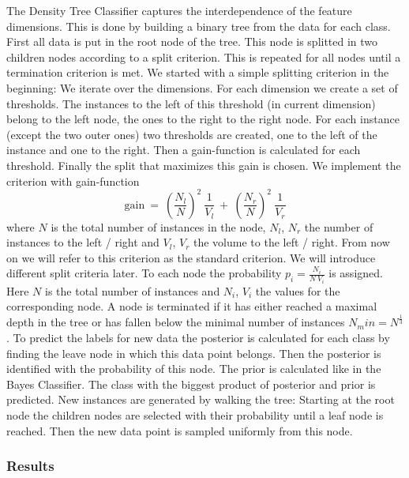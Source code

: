 \documentclass[draft]{article}
\begin{document}
The Density Tree Classifier captures the interdependence of the feature dimensions. This is done by 
building a binary tree from the data for each class.
First all data is put in the root node of the tree. This node is splitted in two children nodes according to a split criterion.
This is repeated for all nodes until a termination criterion is met.
\newline
We started with a simple splitting criterion in the beginning:
We iterate over the dimensions. For each dimension we create a set of thresholds. 
The instances to the left of this threshold (in current dimension) belong to the left node, the ones to 
the right to the right node. For each instance (except the two outer ones) two thresholds are created, one to the left
of the instance and one to the right.
Then a gain-function is calculated for each threshold. Finally the split that maximizes this gain is chosen.
We implement the criterion with gain-function
\begin{equation}
	\mathrm{gain} ~ = ~ ( \frac{N_l}{N} )^2 ~ \frac{1}{V_l} ~ +  ~ ( \frac{N_r}{N} )^2 ~ \frac{1}{V_r} 
\end{equation}
where $N$ is the total number of instances in the node, $N_l$, $N_r$ the number of instances to the left / right
and $V_l$, $V_r$ the volume to the left / right.
From now on we will refer to this criterion as the standard criterion. We will introduce different split 
criteria later.
\newline
To each node the probability $p_i = \frac{N_i}{N ~ V_i}$ is assigned. Here $N$ is the total number of instances
and $N_i$, $V_i$ the values for the corresponding node.
\newline
A node is terminated if it has either reached a maximal depth in the tree or has fallen below the minimal number
of instances $N_min = N^{\frac{1}{3}}$.
\newline
To predict the labels for new data the posterior is calculated for each class by finding the leave node in which this data point
belongs. Then the posterior is identified with the probability of this node. The prior is calculated like in the
Bayes Classifier. The class with the biggest product of posterior and prior is predicted.
\newline
New instances are generated by walking the tree: Starting at the root node the children nodes are selected with their
probability until a leaf node is reached. Then the new data point is sampled uniformly from this node.

\subsubsection{Results}\label{res}
\end{document}
